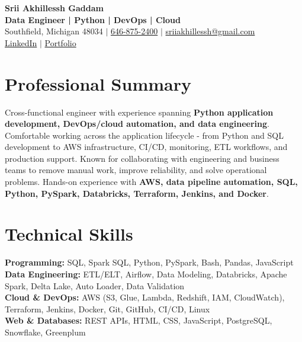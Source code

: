 \documentclass[letterpaper,10pt]{article}
\begin{document}
\fontsize{9.35pt}{10.45pt}\selectfont

\begin{center}
    {\LARGE \textbf{Srii Akhillessh Gaddam}} \\[-1pt]
    \textbf{Data Engineer | Python | DevOps | Cloud} \\[2pt]
    Southfield, Michigan 48034 $|$
    \href{tel:6468752400}{646-875-2400} $|$
    \href{mailto:sriiakhillessh@gmail.com}{sriiakhillessh@gmail.com} \\[1pt]
    \href{https://www.linkedin.com/in/srii-akhiilessh-gaddam-b48668191/}{LinkedIn} $|$
    \href{https://sriiakhillesshg.github.io/portfolio/}{Portfolio}
\end{center}
\vspace{-8pt}

\section{Professional Summary}
\small{Cross-functional engineer with experience spanning \textbf{Python application development, DevOps/cloud automation, and data engineering}. Comfortable working across the application lifecycle - from Python and SQL development to AWS infrastructure, CI/CD, monitoring, ETL workflows, and production support. Known for collaborating with engineering and business teams to remove manual work, improve reliability, and solve operational problems. Hands-on experience with \textbf{AWS, data pipeline automation, SQL, Python, PySpark, Databricks, Terraform, Jenkins, and Docker}.}

\section{Technical Skills}
\small{
\textbf{Programming:} SQL, Spark SQL, Python, PySpark, Bash, Pandas, JavaScript \\
\textbf{Data Engineering:} ETL/ELT, Airflow, Data Modeling, Databricks, Apache Spark, Delta Lake, Auto Loader, Data Validation \\
\textbf{Cloud \& DevOps:} AWS (S3, Glue, Lambda, Redshift, IAM, CloudWatch), Terraform, Jenkins, Docker, Git, GitHub, CI/CD, Linux \\
\textbf{Web \& Databases:} REST APIs, HTML, CSS, JavaScript, PostgreSQL, Snowflake, Greenplum
}

\end{document}
